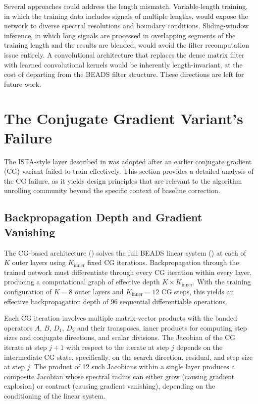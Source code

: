 Several approaches could address the length mismatch. Variable-length training, in which the training data includes signals of multiple lengths, would expose the network to diverse spectral resolutions and boundary conditions. Sliding-window inference, in which long signals are processed in overlapping segments of the training length and the results are blended, would avoid the filter recomputation issue entirely. A convolutional architecture that replaces the dense matrix filter with learned convolutional kernels would be inherently length-invariant, at the cost of departing from the BEADS filter structure. These directions are left for future work.


\section{The Conjugate Gradient Variant's Failure}
\label{sec:disc_cg}

The ISTA-style layer described in  was adopted after an earlier conjugate gradient (CG) variant failed to train effectively. This section provides a detailed analysis of the CG failure, as it yields design principles that are relevant to the algorithm unrolling community beyond the specific context of baseline correction.


\subsection{Backpropagation Depth and Gradient Vanishing}
\label{sec:disc_cg_depth}

The CG-based architecture () solves the full BEADS linear system () at each of $K$ outer layers using $K_{\text{inner}}$ fixed CG iterations. Backpropagation through the trained network must differentiate through every CG iteration within every layer, producing a computational graph of effective depth $K \times K_{\text{inner}}$. With the training configuration of $K = 8$ outer layers and $K_{\text{inner}} = 12$ CG steps, this yields an effective backpropagation depth of 96 sequential differentiable operations.

Each CG iteration involves multiple matrix-vector products with the banded operators $A$, $B$, $D_1$, $D_2$ and their transposes, inner products for computing step sizes and conjugate directions, and scalar divisions. The Jacobian of the CG iterate at step $j+1$ with respect to the iterate at step $j$ depends on the intermediate CG state, specifically, on the search direction, residual, and step size at step $j$. The product of 12 such Jacobians within a single layer produces a composite Jacobian whose spectral radius can either grow (causing gradient explosion) or contract (causing gradient vanishing), depending on the conditioning of the linear system.

